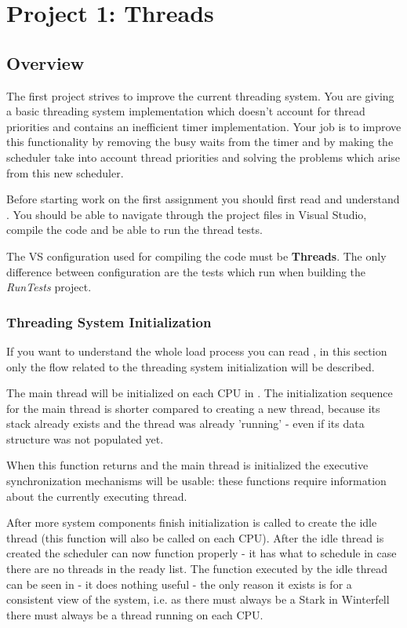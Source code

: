 \chapter{Project 1: Threads}

\section{Overview}

The first project strives to improve the current threading system. You are giving a basic threading
system implementation which doesn't account for thread priorities and contains an inefficient timer
implementation. Your job is to improve this functionality by removing the busy waits from the timer
and by making the scheduler take into account thread priorities and solving the problems which arise
from this new scheduler.

Before starting work on the first assignment you should first read and understand
. You should be able to navigate through the project files in Visual
Studio, compile the code and be able to run the thread tests.

The VS configuration used for compiling the code must be \textbf{Threads}. The only difference
between configuration are the tests which run when building the \textit{RunTests} project.

\subsection{Threading System Initialization}

If you want to understand the whole \projectname load process you can read ,
in this section only the flow related to the threading system initialization will be described.

The main thread will be initialized on each CPU in . The
initialization sequence for the main thread is shorter compared to creating a new thread, because
its stack already exists and the thread was already 'running' - even if its data structure was
not populated yet.

When this function returns and the main thread is initialized the executive synchronization
mechanisms will be usable: these functions require information about the currently executing thread.

After more system components finish initialization  is
called to create the idle thread (this function will also be called on each CPU). After the idle
thread is created the scheduler can now function properly - it has what to schedule in case there
are no threads in the ready list. The function executed by the idle thread can be seen in
 - it does nothing useful - the only reason it exists is for a consistent view of
the system, i.e. as there must always be a Stark in Winterfell \cite{asoiaf} there must always be a
thread running on each CPU.

